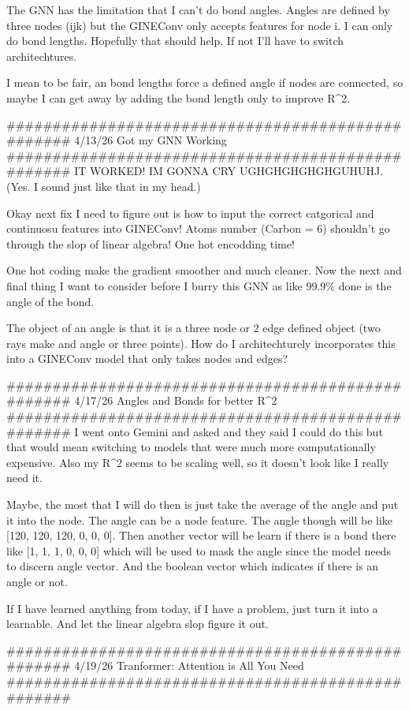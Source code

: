 The GNN has the limitation that I can't do bond angles. Angles are defined by three nodes (ijk)
but the GINEConv only accepts features for node i. I can only do bond lengths. Hopefully that should help. 
If not I'll have to switch architechtures.

I mean to be fair, an bond lengths force a defined angle if nodes are connected, so maybe I 
can get away by adding the bond length only to improve R^2. 

##################################################
4/13/26 Got my GNN Working
##################################################
IT WORKED! IM GONNA CRY UGHGHGHGHGHGUHUHJ. (Yes. I sound just like that in my head.)

Okay next fix I need to figure out is how to input the correct catgorical and continuosu features
into GINEConv! Atoms number (Carbon = 6) shouldn't go through the slop of linear algebra!
One hot encodding time! 

One hot coding make the gradient smoother and much cleaner. Now the next and final thing I want to consider before I burry this 
GNN as like 99.9\% done is the angle of the bond. 

The object of an angle is that it is a three node or 2 edge defined object 
(two rays make and angle or three points). How do I architechturely incorporates this into a GINEConv
model that only takes nodes and edges?

##################################################
4/17/26 Angles and Bonds for better R^2
##################################################
I went onto Gemini and asked and they said I could do this but that would mean switching to models that were much more computationally expensive. 
Also my R^2 seems to be scaling well, so it doesn't look like I really need it. 

Maybe, the most that I will do then is just take the average of the angle and put it into the node. 
The angle can be a node feature. The angle though will be like [120, 120, 120, 0, 0, 0]. Then another vector will be learn if there is a
bond there like [1, 1, 1, 0, 0, 0] which will be used to mask the angle since the model needs to discern angle vector. 
And the boolean vector which indicates if there is an angle or not.

If I have learned anything from today, if I have a problem, just turn it into a learnable. And let the linear algebra slop figure it out. 

##################################################
4/19/26 Tranformer: Attention is All You Need
##################################################

